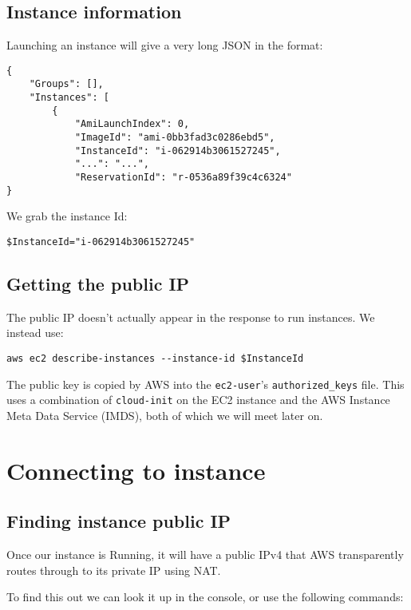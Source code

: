 \documentclass{pgnotes}
\begin{document}
\subsection{Instance information}\label{instance-information}

Launching an instance will give a very long JSON in the format:

\begin{verbatim}
{
    "Groups": [],
    "Instances": [
        {
            "AmiLaunchIndex": 0,
            "ImageId": "ami-0bb3fad3c0286ebd5",
            "InstanceId": "i-062914b3061527245",
            "...": "...",
            "ReservationId": "r-0536a89f39c4c6324"
}
\end{verbatim}

We grab the instance Id:
\begin{verbatim}
$InstanceId="i-062914b3061527245"
\end{verbatim}

\subsection{Getting the public IP}

The public IP doesn't actually appear in the response to run instances.
We instead use:
\begin{verbatim}
aws ec2 describe-instances --instance-id $InstanceId
\end{verbatim}


The public key is copied by AWS into the \texttt{ec2-user}'s
\texttt{authorized\_keys} file. This uses a combination of
\texttt{cloud-init} on the EC2 instance and the AWS Instance Meta Data
Service (IMDS), both of which we will meet later on.

\section{Connecting to instance}\label{sec:connecting-to-instance}

\subsection{Finding instance public
IP}\label{sec:finding-instance-public-ip}

Once our instance is Running, it will have a public IPv4 that AWS
transparently routes through to its private IP using NAT.

To find this out we can look it up in the console, or use the following
commands:
\end{document}
